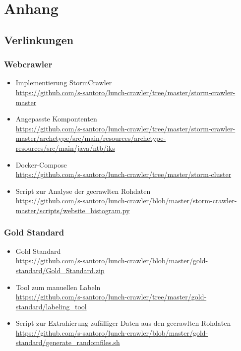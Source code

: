 \chapter{Anhang}
\section{Verlinkungen}
\subsection{Webcrawler}
\begin{itemize}
	\item Implementierung StormCrawler\\ \url{https://github.com/s-santoro/lunch-crawler/tree/master/storm-crawler-master}
	\item Angepasste Kompontenten\\
	\url{https://github.com/s-santoro/lunch-crawler/tree/master/storm-crawler-master/archetype/src/main/resources/archetype-resources/src/main/java/ntb/iks}
	\item Docker-Compose\\
	\url{https://github.com/s-santoro/lunch-crawler/tree/master/storm-cluster}
	\item Script zur Analyse der gecrawlten Rohdaten\\
	\url{https://github.com/s-santoro/lunch-crawler/blob/master/storm-crawler-master/scripts/website_histogram.py}
\end{itemize} 
\subsection{Gold Standard}
\label{app:gold_standard}
\begin{itemize}
	\item Gold Standard\\ 
	\url{https://github.com/s-santoro/lunch-crawler/blob/master/gold-standard/Gold_Standard.zip}
	\item Tool zum manuellen Labeln\\ 
	\url{https://github.com/s-santoro/lunch-crawler/tree/master/gold-standard/labeling_tool}
	\item Script zur Extrahierung zufälliger Daten aus den gecrawlten Rohdaten\\ 
	\url{https://github.com/s-santoro/lunch-crawler/blob/master/gold-standard/generate_randomfiles.sh}
\end{itemize} 
